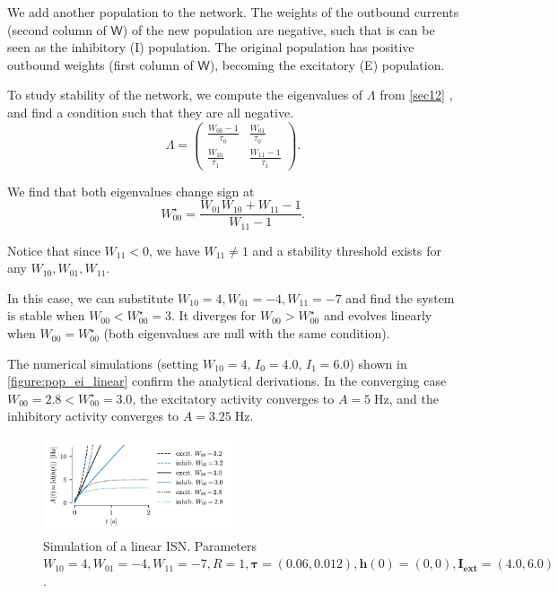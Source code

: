 \documentclass[10pt,conference,compsocconf,a4paper]{IEEEtran}
\renewcommand{\vec}[1]{\boldsymbol{#1}}
\newcommand*{\shortautoref}[1]{%
	\begingroup
	\def\equationautorefname{\textsc{Eq.}}%
	\def\tableautorefname{\textsc{Tab.}}%
	\def\figureautorefname{\textsc{Fig.}}%
	\autoref{#1}%
	\endgroup
}
\begin{document}
		We add another population to the network. The weights of the outbound currents (second column of $\mathsf W$) of the new population are negative, such that is can be seen as the inhibitory (I) population. The original population has positive outbound weights (first column of $\mathsf W$), becoming the excitatory (E) population.

		To study stability of the network, we compute the eigenvalues of $\Lambda$ from \shortautoref{sec12}, and find a condition such that they are all negative.
\
		\begin{equation*}
			\Lambda = \begin{pmatrix}\frac{W_{00} - 1}{\tau_{0}} & \frac{W_{01}}{\tau_{0}}\\\frac{W_{10}}{\tau_{1}} & \frac{W_{11} - 1}{\tau_{1}}\end{pmatrix}.
		\end{equation*}

		We find that both eigenvalues change sign at
\
		\begin{equation*}
			W_{00}^\star = \frac{W_{01} W_{10} + W_{11} - 1}{W_{11} - 1}.
		\end{equation*}

		Notice that since $W_{11} < 0$, we have $W_{11} \neq 1$ and a stability threshold exists for any $W_{10}, W_{01}, W_{11}$.

		In this case, we can substitute $W_{10} = 4, W_{01} = -4, W_{11} = -7$ and find the system is stable when $W_{00} < W_{00}^\star = 3$. It diverges for $W_{00} > W_{00}^\star$ and evolves linearly when $W_{00} = W_{00}^\star$ (both eigenvalues are null with the same condition).

		The numerical simulations (setting $W_{10} = 4$, $I_0 = 4.0$, $I_1 = 6.0$) shown in \shortautoref{figure:pop_ei_linear} confirm the analytical derivations. In the converging case $W_{00} = 2.8 < W_{00}^\star = 3.0$, the excitatory activity converges to $A = 5 \; \text{Hz}$, and the inhibitory activity converges to $A = 3.25 \; \text{Hz}$.

		\begin{figure}
			\centering
			\includegraphics[width=0.5\textwidth]{figures/pop_ei_linear.pdf}
			\caption{Simulation of a linear ISN. Parameters $W_{10} = 4, W_{01} = -4, W_{11} = -7, R = 1, \vec \tau = (0.06, 0.012), \vec{h}(0) = (0,0), \vec{I_{\text{ext}}} = (4.0, 6.0)$.}
			\label{figure:pop_ei_linear}
		\end{figure}
\end{document}
